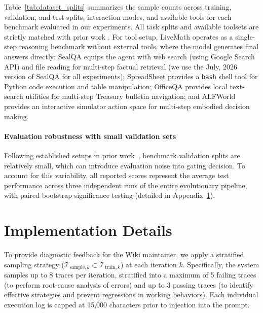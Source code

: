 \documentclass[11pt, a4paper, copyright, gr]{google}
\begin{document}
Table~\ref{tab:dataset_splits} summarizes the sample counts across training, validation, and test splits, interaction modes, and available tools for each benchmark evaluated in our experiments. All task splits and available toolsets are strictly matched with prior work \citep{yang2026skillopt, alzubi2026evoskill}. For tool setup, LiveMath operates as a single-step reasoning benchmark without external tools, where the model generates final answers directly; SealQA equips the agent with web search (using Google Search API) and file reading for multi-step factual retrieval (we use the July, 2026 version of SealQA for all experiments); SpreadSheet provides a \texttt{bash} shell tool for Python code execution and table manipulation; OfficeQA provides local text-search utilities for multi-step Treasury bulletin navigation; and ALFWorld provides an interactive simulator action space for multi-step embodied decision making.

\paragraph{Evaluation robustness with small validation sets}
Following established setups in prior work~\citep{yang2026skillopt, alzubi2026evoskill}, benchmark validation splits are relatively small, which can introduce evaluation noise into gating decision. To account for this variability, all reported scores represent the average test performance across three independent runs of the entire evolutionary pipeline, with paired bootstrap significance testing (detailed in Appendix~\ref{appendix:implementation}).



\section{Implementation Details}
\label{appendix:implementation}


To provide diagnostic feedback for the Wiki maintainer, we apply a stratified sampling strategy ($\mathcal{T}_{\text{sample}, k} \subset \mathcal{T}_{\text{train}, k}$) at each iteration $k$. Specifically, the system samples up to 8 traces per iteration, stratified into a maximum of 5 failing traces (to perform root-cause analysis of errors) and up to 3 passing traces (to identify effective strategies and prevent regressions in working behaviors). Each individual execution log is capped at 15,000 characters prior to injection into the prompt.
\end{document}
